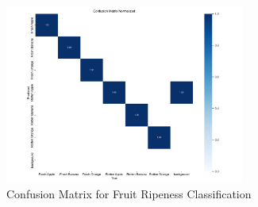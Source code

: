\begin{figure}[ht]
\centering
\includegraphics[width=0.7\textwidth]{datas/agriculture/confusion_matrix_normalized.png}
\caption{Confusion Matrix for Fruit Ripeness Classification}
\label{fig:fruit_confusion}
\end{figure}


